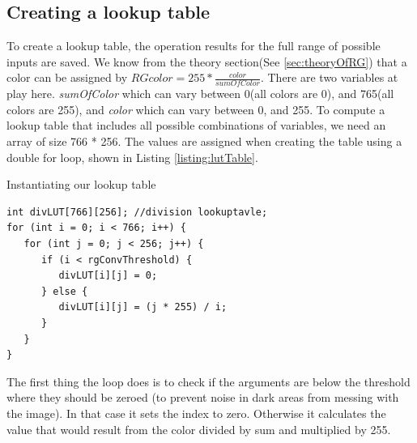 \subsection{Creating a lookup table}
To create a lookup table, the operation results for the full range of possible inputs are saved. We know from the theory section(See \autoref{sec:theoryOfRG}) that a color can be assigned by $RGcolor = 255 * \frac{color}{sumOfColor}$. There are two variables at play here. \textit{sumOfColor} which can vary between 0(all colors are 0), and 765(all colors are 255), and \textit{color} which can vary between 0, and 255. To compute a lookup table  that includes all possible combinations of variables, we need an array of size 766 * 256. The values are assigned when creating the table using a double for loop, shown in Listing \ref{listing:lutTable}.
\begin{listing}[H]
\caption{Instantiating our lookup table}
\label{listing:lutTable}
\begin{verbatim}
int divLUT[766][256]; //division lookuptavle;
for (int i = 0; i < 766; i++) {
   for (int j = 0; j < 256; j++) {
      if (i < rgConvThreshold) { 
         divLUT[i][j] = 0;
      } else {
         divLUT[i][j] = (j * 255) / i;
      }
   }
}
\end{verbatim}
\end{listing}
The first thing the loop does is to check if the arguments are below the threshold where they should be zeroed (to prevent noise in dark areas from messing with the image). In that case it sets the index to zero. Otherwise it calculates the value that would result from the color  divided by sum  and multiplied by 255.
